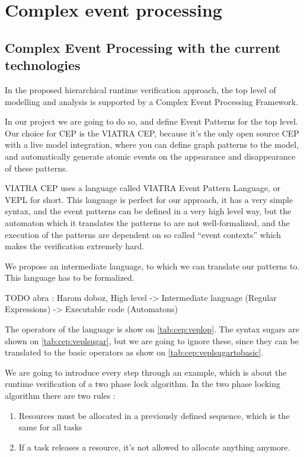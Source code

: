 \chapter{Complex event processing}
	\label{chap:cep}
	\section{Complex Event Processing with the current technologies}
		In the proposed hierarchical runtime verification approach, the top level of modelling and analysis is supported by a Complex Event Processing Framework.
		
		In our project we are going to do so, and define Event Patterns for the top level.
		Our choice for CEP is the VIATRA CEP, because it's the only open source CEP with 
		a live model integration, where you can define graph patterns to the model, and automatically generate atomic events
		on the appearance and disappearance of these patterns.
		
		VIATRA CEP uses a language called VIATRA Event Pattern Language, or VEPL for short.
		This language is perfect for our approach, it has a very simple syntax, and the event patterns can be defined in
		a very high level way, but the automaton which it translates the patterns to are not well-formalized, and the
		execution of the patterns are dependent on so called ``event contexts'' which makes the verification extremely hard.
		
		We propose an intermediate language, to which we can translate our patterns to. This language has to be 
		formalized.
		
		TODO abra : Harom doboz, High level -> Intermediate language (Regular Expressions) -> Executable code (Automatons)

		The operators of the language is show on \cref{tab:cep:veplop}. 
		The syntax sugars are shown on \cref{tab:cep:veplsugar},
		but we are going to ignore these, since they can be translated to the basic operators as show on \cref{tab:cep:veplsugartobasic}.
		
		We are going to introduce every step through an example, which is about the runtime verification of a two phase lock algorithm. %
		In the two phase locking algorithm there are two rules :
		\begin{enumerate}
			\item Resources must be allocated in a previously defined sequence, which is the same for all tasks
			\item If a task releases a resource, it's not allowed to allocate anything anymore.
		\end{enumerate}
		
